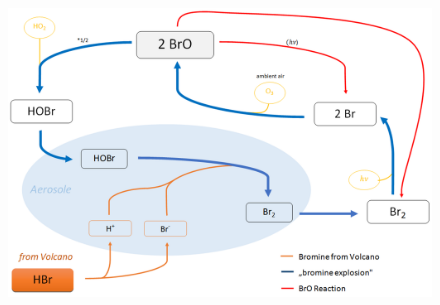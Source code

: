 \documentclass  [
  paper    = a4,
  BCOR     = 10mm,
  twoside,
  fontsize = 12pt,
  fleqn,
  toc      = bibnumbered,
  toc      = listofnumbered,
  numbers  = noendperiod,
  headings = normal,
  listof   = leveldown,
  version  = 3.03
]                                       {scrreprt}
\begin{document}
	\begin{figure}
		\centering
		\includegraphics[width=0.7\linewidth]{Bilder/Simon/Bilder_Tung/BrO_Explosion}
		\caption{}
		\label{fig:broexplosion}
	\end{figure}
	
\end{document}
